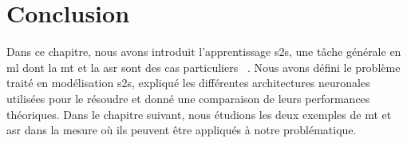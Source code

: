 \section{Conclusion}

Dans ce chapitre, nous avons introduit l'apprentissage \gls{s2s}, 
une tâche générale en \gls{ml} dont la \gls{mt} et la \gls{asr} sont des cas particuliers%
~\cite{Szabo_Plesiak_Yang_Heumann}.
Nous avons défini le problème traité en modélisation \gls{s2s},
expliqué les différentes architectures neuronales utilisées pour le résoudre
et donné une comparaison de leurs performances théoriques.
Dans le chapitre suivant, nous étudions les deux exemples de \gls{mt} et \gls{asr}
dans la mesure où ils peuvent être appliqués à notre problématique.